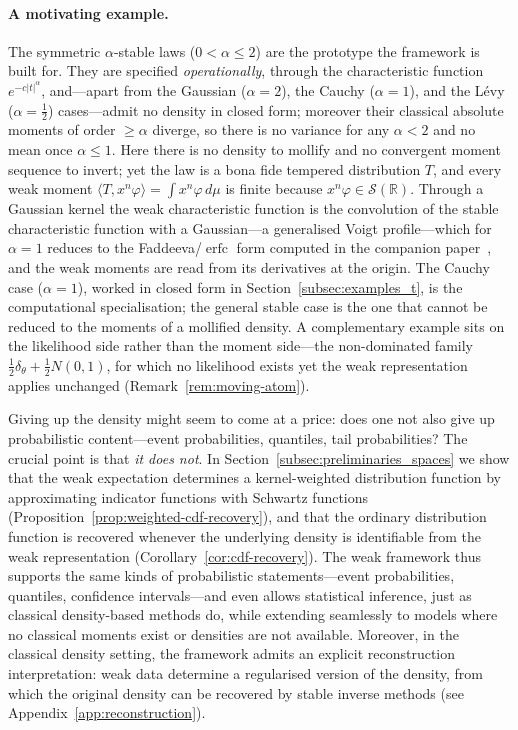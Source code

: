\documentclass[12pt]{article}
\theoremstyle{definition}
\newcommand{\R}{\mathbb{R}}
\begin{document}
\paragraph{A motivating example.}
The symmetric $\alpha$-stable laws ($0<\alpha\le2$) are the prototype the framework is built for.  They are specified \emph{operationally}, through the characteristic function $e^{-c|t|^\alpha}$, and---apart from the Gaussian ($\alpha=2$), the Cauchy ($\alpha=1$), and the L\'evy ($\alpha=\tfrac12$) cases---admit no density in closed form; moreover their classical absolute moments of order $\ge\alpha$ diverge, so there is no variance for any $\alpha<2$ and no mean once $\alpha\le1$.  Here there is no density to mollify and no convergent moment sequence to invert; yet the law is a bona fide tempered distribution $T$, and every weak moment $\langle T,x^n\varphi\rangle=\int x^n\varphi\,d\mu$ is finite because $x^n\varphi\in\mathcal{S}(\R)$.  Through a Gaussian kernel the weak characteristic function is the convolution of the stable characteristic function with a Gaussian---a generalised Voigt profile---which for $\alpha=1$ reduces to the Faddeeva/$\operatorname{erfc}$ form computed in the companion paper~\cite{LabouriauA2}, and the weak moments are read from its derivatives at the origin.  The Cauchy case ($\alpha=1$), worked in closed form in Section~\ref{subsec:examples_t}, is the computational specialisation; the general stable case is the one that cannot be reduced to the moments of a mollified density.  A complementary example sits on the likelihood side rather than the moment side---the non-dominated family $\tfrac12\delta_\theta+\tfrac12 N(0,1)$, for which no likelihood exists yet the weak representation applies unchanged (Remark~\ref{rem:moving-atom}).

Giving up the density might seem to come at a price: does one not also give up probabilistic content---event probabilities, quantiles, tail probabilities?  The crucial point is that \emph{it does not}.  In Section~\ref{subsec:preliminaries_spaces} we show that the weak expectation determines a kernel-weighted distribution function by approximating indicator functions with Schwartz functions (Proposition~\ref{prop:weighted-cdf-recovery}), and that the ordinary distribution function is recovered whenever the underlying density is identifiable from the weak representation (Corollary~\ref{cor:cdf-recovery}).  The weak framework thus supports the same kinds of probabilistic statements---event probabilities, quantiles, confidence intervals---and even allows statistical inference, just as classical density-based methods do, while extending seamlessly to models where no classical moments exist or densities are not available.  Moreover, in the classical density setting, the framework admits an explicit reconstruction interpretation: weak data determine a regularised version of the density, from which the original density can be recovered by stable inverse methods (see Appendix~\ref{app:reconstruction}).
\end{document}
